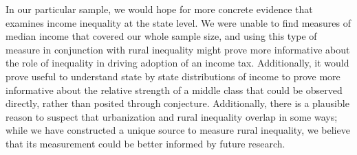 \documentclass[letter, 12pt]{article}
\begin{document}
In our particular sample, we would hope for more concrete evidence that examines income inequality at the state level. We were unable to find measures of median income that covered our whole sample size, and using this type of measure in conjunction with rural inequality might prove more informative about the role of inequality in driving adoption of an income tax. Additionally, it would prove useful to understand state by state distributions of income to prove more informative about the relative strength of a middle class that could be observed directly, rather than posited through conjecture. Additionally, there is a plausible reason to suspect that urbanization and rural inequality overlap in some ways; while we have constructed a unique source to measure rural inequality, we believe that its measurement could be better informed by future research.

\pagebreak


\end{document}
